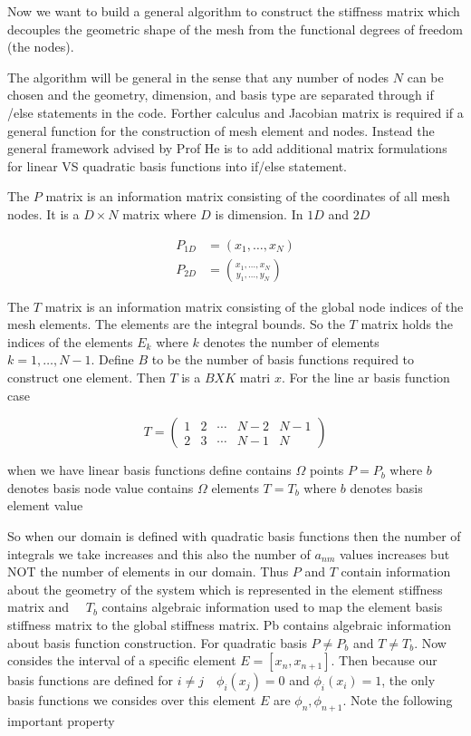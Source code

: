 \documentclass[12pt, oneside]{book}
\begin{document}
Now we want to build a general algorithm to construct the stiffness matrix which decouples the geometric shape of the mesh from the functional degrees of freedom (the nodes).

The algorithm will be general in the sense that any number of nodes $N$ can be chosen and the geometry, dimension, and basis type are separated through if /else statements in the code. Forther calculus and Jacobian matrix is required if a general function for the construction of mesh element and nodes. Instead the general framework advised by Prof He is to add additional matrix formulations for linear VS quadratic basis functions into if/else statement.

The $P$ matrix is an information matrix consisting of the coordinates of all mesh nodes. It is a $D \times N$ matrix where $D$ is dimension. In $1 D$ and $2 D$

$$
\begin{aligned}
P_{1 D} & =\left(x_{1}, \ldots, x_{N}\right) \\
P_{2 D} & =\binom{x_{1}, \ldots, x_{N}}{y_{1}, \ldots, y_{N}}
\end{aligned}
$$

The $T$ matrix is an information matrix consisting of the global node indices of the mesh elements. The elements are the integral bounds. So the $T$ matrix holds the indices of the elements $E_{k}$ where $k$ denotes the number of elements $k=1, \ldots, N-1$. Define $B$ to be the number of basis functions required to construct one element. Then $T$ is a $B X K$ matri $x$. For the line ar basis function case

$$
T=\left(\begin{array}{lllll}
1 & 2 & \cdots & N-2 & N-1 \\
2 & 3 & \cdots & N-1 & N
\end{array}\right)
$$

when we have linear basis functions define
contains $\Omega$ points $P=P_{b}$ where $b$ denotes basis node value contains $\Omega$ elements $T=T_{b}$ where $b$ denotes basis element value

So when our domain is defined with quadratic basis functions then the number of integrals we take increases and this also the number of $a_{n m}$ values increases but NOT the number of elements in our domain. Thus $P$ and $T$ contain information about the geometry of the system which is represented in the element stiffness matrix and $\quad T_{b}$ contains algebraic information used to map the element basis stiffness matrix to the global stiffness matrix. Pb contains algebraic information about basis function construction. For quadratic
basis $P \neq P_{b}$ and $T \neq T_{b}$.
Now consides the interval of a specific element $E=\left[x_{n}, x_{n+1}\right]$. Then because our basis functions are defined for $i \neq j \quad \phi_{i}\left(x_{j}\right)=0$ and $\phi_{i}\left(x_{i}\right)=1$, the only basis functions we consides over this element $E$ are $\phi_{n}, \phi_{n+1}$. Note the following important property
\end{document}
